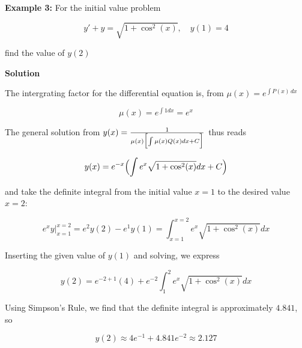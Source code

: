 \nopagenumbers
{\bf Example 3:} For the initial value problem

$$y'+y=\sqrt{1+\cos^2(x)},\quad y(1)=4$$

find the value of $y(2)$

\vskip 10pt
{\bf Solution}

\vskip 6pt
The intergrating factor for the differential equation is, from $\mu(x)=e^{\int P(x)\,dx}$

$$\mu(x)=e^{\int 1dx}=e^x$$

The general solution from $y(x)={1\over\mu(x)\Bigl[\int\mu(x)Q(x)dx+C\Bigr]}$ thus reads

\vskip 3mm
$$y(x)=e^{-x}\Bigl(\int e^x\sqrt{1+\cos^2(x)}dx+C\Bigr)$$

and take the definite integral from the initial value $x=1$ to the desired value $x=2$:

$$e^xy\bigg\vert^{x=2}_{x=1}=e^2y(2)-e^1y(1)=\int^{x=2}_{x=1}e^x\sqrt{1+\cos^2(x)}dx$$

Inserting the given value of $y(1)$ and solving, we express

$$y(2)=e^{-2+1}(4)+e^{-2}\int^2_1e^x\sqrt{1+\cos^2(x)}dx$$

Using Simpson's Rule, we find that the definite integral is approximately $4.841$, so

$$y(2)\approx 4e^{-1}+4.841e^{-2}\approx 2.127$$

\vfill\eject
\bye
